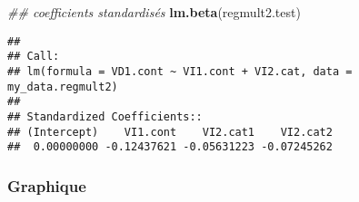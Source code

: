 \documentclass[
]{book}
\newenvironment{Shaded}{\begin{snugshade}}{\end{snugshade}}
\newcommand{\CommentTok}[1]{\textcolor[rgb]{0.56,0.35,0.01}{\textit{#1}}}
\newcommand{\KeywordTok}[1]{\textcolor[rgb]{0.13,0.29,0.53}{\textbf{#1}}}
\newcommand{\NormalTok}[1]{#1}
\begin{document}
\begin{Shaded}
\begin{Highlighting}[]
\CommentTok{## coefficients standardisés}
\KeywordTok{lm.beta}\NormalTok{(regmult2.test)}
\end{Highlighting}
\end{Shaded}

\begin{verbatim}
## 
## Call:
## lm(formula = VD1.cont ~ VI1.cont + VI2.cat, data = my_data.regmult2)
## 
## Standardized Coefficients::
## (Intercept)    VI1.cont    VI2.cat1    VI2.cat2 
##  0.00000000 -0.12437621 -0.05631223 -0.07245262
\end{verbatim}

\hypertarget{graphique-6}{%
\subsubsection{Graphique}\label{graphique-6}}
\end{document}

